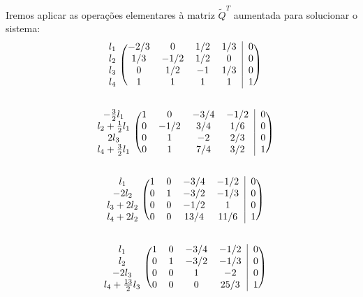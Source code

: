 \begin{questions}
\begin{solution}
\begin{parts}
Iremos aplicar as operações elementares à matriz $\tilde{Q}^T$ aumentada para solucionar o sistema:
\begin{equation}
\begin{blockarray}{cccccc}
\begin{block}{c(cccc|c)}
 l_1 & -2/3 & 0    & 1/2 & 1/3 & 0  \\
 l_2 & 1/3  & -1/2 & 1/2 & 0   & 0  \\
 l_3 & 0    & 1/2  & -1  & 1/3 & 0  \\
 l_4 & 1    & 1    & 1   & 1   & 1  \\
\end{block}
\end{blockarray} 
\end{equation}


\begin{equation}
\begin{blockarray}{cccccc}
\begin{block}{c(cccc|c)}
 -\frac{3}{2} l_1      & 1    & 0    & -3/4 & -1/2 & 0  \\
 l_2 + \frac{1}{2} l_1 & 0    & -1/2 & 3/4  & 1/6  & 0  \\
 2 l_3                 & 0    & 1    & -2   & 2/3  & 0  \\
 l_4 + \frac{3}{2} l_1 & 0    & 1    & 7/4  & 3/2  & 1  \\
\end{block}
\end{blockarray} 
\end{equation}

\begin{equation}
\begin{blockarray}{cccccc}
\begin{block}{c(cccc|c)}
 l_1         & 1    & 0    & -3/4 & -1/2 & 0  \\
 -2 l_2      & 0    & 1    & -3/2 & -1/3 & 0  \\
 l_3 + 2 l_2 & 0    & 0    & -1/2 & 1    & 0  \\
 l_4 + 2 l_2 & 0    & 0    & 13/4 & 11/6 & 1  \\
\end{block}
\end{blockarray} 
\end{equation}

\begin{equation}
\begin{blockarray}{cccccc}
\begin{block}{c(cccc|c)}
 l_1                    & 1    & 0    & -3/4 & -1/2 & 0  \\
 l_2                    & 0    & 1    & -3/2 & -1/3 & 0  \\
 -2 l_3                 & 0    & 0    & 1    & -2   & 0  \\
 l_4 + \frac{13}{2} l_3 & 0    & 0    & 0    & 25/3 & 1  \\
\end{block}
\end{blockarray} 
\end{equation}


\end{parts}
\end{solution}
\end{questions}
